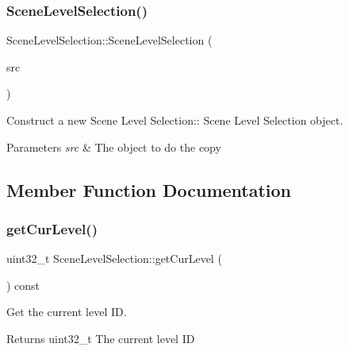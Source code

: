 \subsubsection{\texorpdfstring{Scene\+Level\+Selection()}{SceneLevelSelection()}\hspace{0.1cm}{\footnotesize\ttfamily [2/2]}}
{\footnotesize\ttfamily Scene\+Level\+Selection\+::\+Scene\+Level\+Selection (\begin{DoxyParamCaption}\item[{\hyperlink{class_scene_level_selection}{Scene\+Level\+Selection} const \&}]{src }\end{DoxyParamCaption})}



Construct a new Scene Level Selection\+:\+: Scene Level Selection object. 


\begin{DoxyParams}{Parameters}
{\em src} & The object to do the copy \\
\hline
\end{DoxyParams}


\subsection{Member Function Documentation}
\mbox{\label{class_scene_level_selection_a2ac8c1a5ac511ec2a048fd794f20f84b}} 
\subsubsection{\texorpdfstring{get\+Cur\+Level()}{getCurLevel()}}
{\footnotesize\ttfamily uint32\+\_\+t Scene\+Level\+Selection\+::get\+Cur\+Level (\begin{DoxyParamCaption}{ }\end{DoxyParamCaption}) const}



Get the current level ID. 

\begin{DoxyReturn}{Returns}
uint32\+\_\+t The current level ID 
\end{DoxyReturn}
\mbox{\label{class_scene_level_selection_aedb8f99f461300aeadd7044c009f53e8}} 
